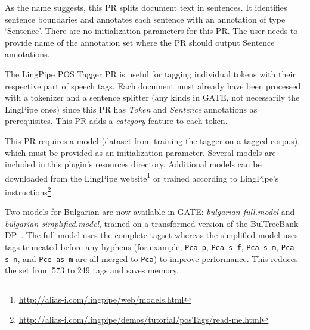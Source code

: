 
As the name suggests, this PR splits document text in sentences.  It
identifies sentence boundaries and annotates each sentence with an annotation
of type `Sentence'.  There are no initialization parameters for this PR. The
user needs to provide name of the annotation set where the PR should output
Sentence annotations.

%
The LingPipe POS Tagger PR is useful for tagging individual tokens with their
respective part of speech tags.  Each document must already have been processed
with a tokenizer and a sentence splitter (any kinds in GATE, not necessarily the
LingPipe ones) since this PR has \emph{Token} and \emph{Sentence} annotations as
prerequisites.  This PR adds a \emph{category} feature to each token.

This PR requires a model (dataset from training the tagger on a tagged corpus),
which must be provided as an initialization parameter.  Several models are
included in this plugin's resources directory.  Additional models can be
downloaded from the LingPipe
website\footnote{\url{http://alias-i.com/lingpipe/web/models.html}} or trained
according to LingPipe's
instructions\footnote{\url{http://alias-i.com/lingpipe/demos/tutorial/posTags/read-me.html}}.


Two models for Bulgarian are now available in GATE: \emph{bulgarian-full.model}
and \emph{bulgarian-simplified.model}, trained on a transformed version of the
BulTreeBank-DP~\cite{btb-stylebook,btb-2003,btb-2002,btb-2004}.  The full model
uses the complete tagset \cite{btb-tagset} whereas the simplified model uses
tags truncated before any hyphens (for example, \texttt{Pca--p},
\texttt{Pca--s-f}, \texttt{Pca--s-m}, \texttt{Pca--s-n}, and \texttt{Pce-as-m}
are all merged to \texttt{Pca}) to improve performance.  This reduces the set
from 573 to 249 tags and saves memory.


